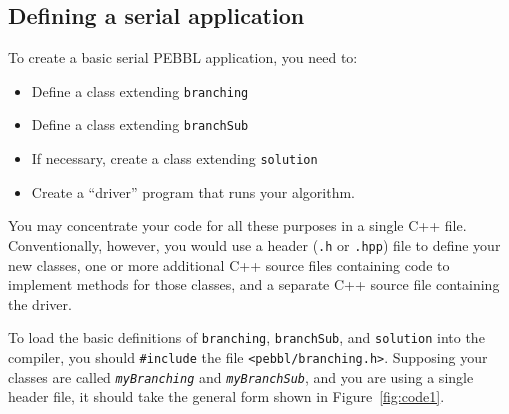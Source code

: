 \subsection{Defining a serial application}
\label{sec:serialMethods}
To create a basic serial PEBBL application, you need to:
\begin{itemize}
\item Define a class extending \texttt{branching}
\item Define a class extending \texttt{branchSub}
\item If necessary, create a class extending \texttt{solution}
\item Create a ``driver'' program that runs your algorithm.
\end{itemize}
You may concentrate your code for all these purposes in a single C++
file.  Conventionally, however, you would use a header (\texttt{.h} or
\texttt{.hpp}) file to define your new classes, one or more additional
C++ source files containing code to implement methods for those
classes, and a separate C++ source file containing the driver.

To load the basic definitions of \texttt{branching},
\texttt{branchSub}, and \texttt{solution} 
into the compiler, you should \texttt{\#include}
the file \texttt{<pebbl/branching.h>}.  Supposing your classes are
called \texttt{\emph{myBranching}} and \texttt{\emph{myBranchSub}},
and you are using a single header file, it should take the general
form shown in Figure~\ref{fig:code1}.

